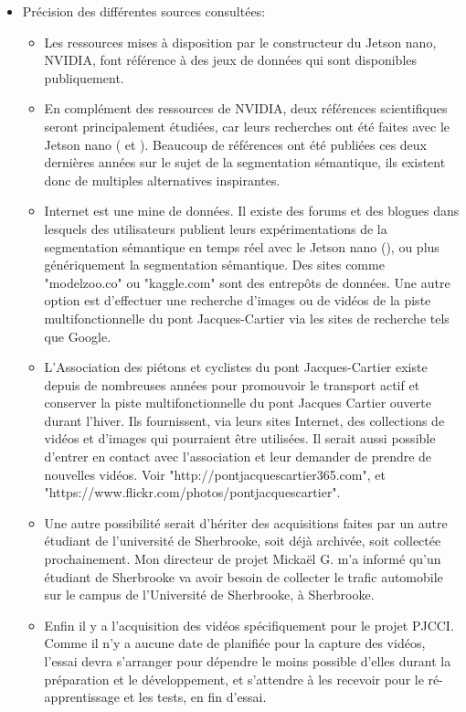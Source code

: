 \begin{itemize}
   \item Précision des différentes sources consultées:
      \begin{itemize}
         \item Les ressources mises à disposition par le constructeur du Jetson nano, NVIDIA, font référence à des jeux de données qui sont disponibles publiquement.
         \item En complément des ressources de NVIDIA, deux références scientifiques seront principalement étudiées, car leurs recherches ont été faites avec le Jetson nano (\cite{nguyen_mavnet_2019} et \cite{chong_real-time_1992}). Beaucoup de références ont été publiées ces deux dernières années sur le sujet de la segmentation sémantique, ils existent donc de multiples alternatives inspirantes.
         \item Internet est une mine de données. Il existe des forums et des blogues dans lesquels des utilisateurs publient leurs expérimentations de la segmentation sémantique en temps réel avec le Jetson nano (\cite{dustin_realtime_2019}), ou plus génériquement la segmentation sémantique. Des sites comme "modelzoo.co" ou "kaggle.com" sont des entrepôts de données. Une autre option est d'effectuer une recherche d'images ou de vidéos de la piste multifonctionnelle du pont Jacques-Cartier via les sites de recherche tels que Google. 
         \item L'Association des piétons et cyclistes du pont Jacques-Cartier existe depuis de nombreuses années pour promouvoir le transport actif et conserver la piste multifonctionnelle du pont Jacques Cartier ouverte durant l'hiver. Ils fournissent, via leurs sites Internet, des collections de vidéos et d'images qui pourraient être utilisées. Il serait aussi possible d'entrer en contact avec l'association et leur demander de prendre de nouvelles vidéos. Voir "http://pontjacquescartier365.com", et\\"https://www.flickr.com/photos/pontjacquescartier".
         \item Une autre possibilité serait d'hériter des acquisitions faites par un autre étudiant de l'université de Sherbrooke, soit déjà archivée, soit collectée prochainement. Mon directeur de projet Mickaël G. m'a informé qu'un étudiant de Sherbrooke va avoir besoin de collecter le trafic automobile sur le campus de l'Université de Sherbrooke, à Sherbrooke. 
         \item Enfin il y a l'acquisition des vidéos spécifiquement pour le projet PJCCI. Comme il n'y a aucune date de planifiée pour la capture des vidéos, l'essai devra s'arranger pour dépendre le moins possible d'elles durant la préparation et le développement, et s'attendre à les recevoir pour le ré-apprentissage et les tests, en fin d'essai.

\end{itemize}
\end{itemize}
